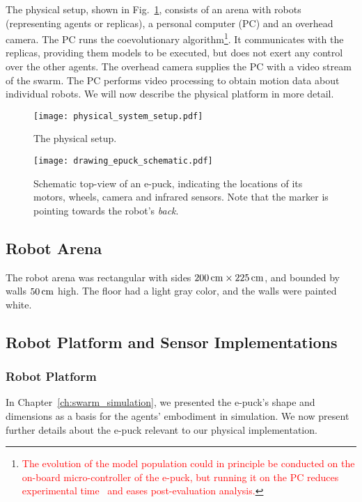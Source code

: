 The physical setup, shown in Fig.~\ref{fig:physical_system_setup}, consists of an arena with robots (representing agents or replicas), a personal computer (PC) and an overhead camera. The PC runs the coevolutionary algorithm\footnote{\textcolor{red}{The evolution of the model population could in principle be conducted on the on-board micro-controller of the e-puck, but running it on the PC reduces experimental time~\cite{Floreano1996} and eases post-evaluation analysis.}}. It communicates with the replicas, providing them models to be executed, but does not exert any control over the other agents. The overhead camera supplies the PC with a video stream of the swarm. The PC performs video processing to obtain motion data about individual robots. We will now describe the physical platform in more detail.

\begin{figure}[!t]
    \centering
    \texttt{[image: physical\_system\_setup.pdf]}
    \caption{The physical setup. }
    \label{fig:physical_system_setup}
\end{figure} 

\begin{figure}[!t]
	\centering
	\texttt{[image: drawing\_epuck\_schematic.pdf]}
	\caption{Schematic top-view of an e-puck, indicating the locations of its motors, wheels, camera and infrared sensors. Note that the marker is pointing towards the robot's \emph{back}.}
	\label{fig:e_puck_schematic}
\end{figure}

\subsection{Robot Arena}

The robot arena was rectangular with sides $\unit[200]{cm} \times \unit[225]{cm}$, and bounded by walls $\unit[50]{cm}$ high. The floor had a light gray color, and the walls were painted white. 

\subsection{Robot Platform and Sensor Implementations}\label{sec:robot_platform_sensor_implementation}

\subsubsection{Robot Platform}
In Chapter~\ref{ch:swarm_simulation}, we presented the e-puck's shape and dimensions as a basis for the agents' embodiment in simulation. We now present further details about the e-puck relevant to our physical implementation. 

